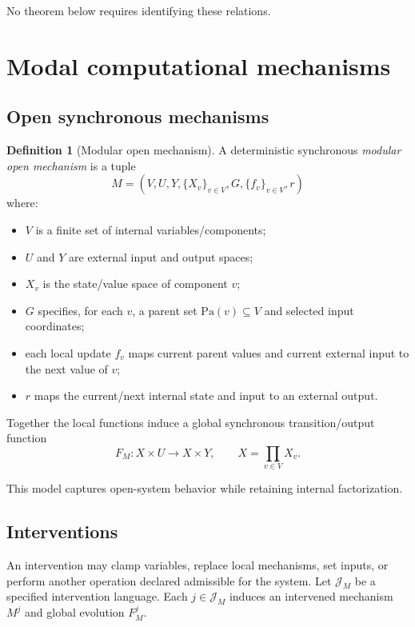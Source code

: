 \documentclass[11pt,a4paper]{article}
\theoremstyle{clean}
\theoremstyle{definition}
\newtheorem{definition}[theorem]{Definition}
\begin{document}
No theorem below requires identifying these relations.

\section{Modal computational mechanisms}

\subsection{Open synchronous mechanisms}

\begin{definition}[Modular open mechanism]
A deterministic synchronous \emph{modular open mechanism} is a tuple
\[
M=(V,U,Y,\{X_v\}_{v\in V},G,\{f_v\}_{v\in V},r)
\]
where:
\begin{itemize}
  \item $V$ is a finite set of internal variables/components;
  \item $U$ and $Y$ are external input and output spaces;
  \item $X_v$ is the state/value space of component $v$;
  \item $G$ specifies, for each $v$, a parent set $\mathrm{Pa}(v)\subseteq V$ and selected input coordinates;
  \item each local update $f_v$ maps current parent values and current external input to the next value of $v$;
  \item $r$ maps the current/next internal state and input to an external output.
\end{itemize}
Together the local functions induce a global synchronous transition/output function
\[
F_M:X\times U\to X\times Y,\qquad X=\prod_{v\in V}X_v.
\]
\end{definition}

This model captures open-system behavior while retaining internal factorization.

\subsection{Interventions}

An intervention may clamp variables, replace local mechanisms, set inputs, or perform another operation declared admissible for the system. Let $\mathcal J_M$ be a specified intervention language. Each $j\in\mathcal J_M$ induces an intervened mechanism $M^j$ and global evolution $F_M^j$.
\end{document}
